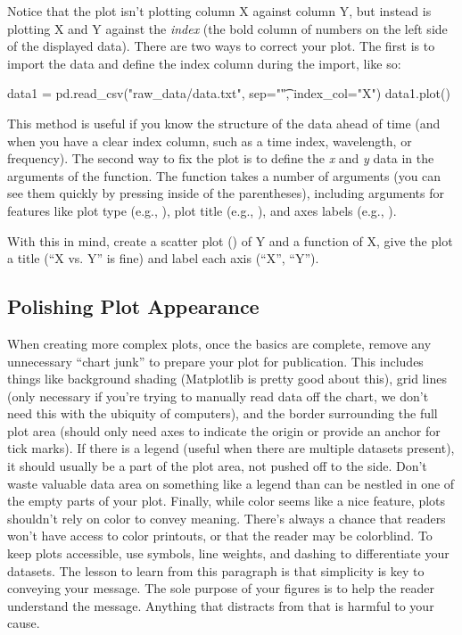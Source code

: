 \documentclass[nobib,nofonts,nols,nohyper]{tufte-handout}
\begin{document}
Notice that the plot isn't plotting column X against column Y, but instead is plotting X and Y against the \emph{index} (the bold column of numbers on the left side of the displayed data).
There are two ways to correct your plot.
The first is to import the data and define the index column during the import, like so:
\begin{pyinput}
data1 = pd.read_csv("raw_data/data.txt", sep="\t", index_col="X")
data1.plot()
\end{pyinput}
This method is useful if you know the structure of the data ahead of time (and when you have a clear index column, such as a time index, wavelength, or frequency).
The second way to fix the plot is to define the \emph{x} and \emph{y} data in the arguments of the  function.
The  function takes a number of arguments (you can see them quickly by pressing  inside of the parentheses), including arguments for features like plot type (e.g., ), plot title (e.g., ), and axes labels (e.g., ).

With this in mind, create a scatter plot () of Y and a function of X, give the plot a title (``X vs. Y'' is fine) and label each axis (``X'', ``Y'').

\subsection{Polishing Plot Appearance} %
\label{sub:polishing_plot_appearance}

When creating more complex plots, once the basics are complete, remove any unnecessary ``chart junk'' to prepare your plot for publication.
This includes things like background shading (Matplotlib is pretty good about this), grid lines (only necessary if you're trying to manually read data off the chart, we don't need this with the ubiquity of computers), and the border surrounding the full plot area (should only need axes to indicate the origin or provide an anchor for tick marks).
If there is a legend (useful when there are multiple datasets present), it should usually be a part of the plot area, not pushed off to the side.
Don't waste valuable data area on something like a legend than can be nestled in one of the empty parts of your plot.
Finally, while color seems like a nice feature, plots shouldn't rely on color to convey meaning.
There's always a chance that readers won't have access to color printouts, or that the reader may be colorblind.
To keep plots accessible, use symbols, line weights, and dashing to differentiate your datasets.
The lesson to learn from this paragraph is that simplicity is key to conveying your message.
The sole purpose of your figures is to help the reader understand the message.
Anything that distracts from that is harmful to your cause.
\end{document}
